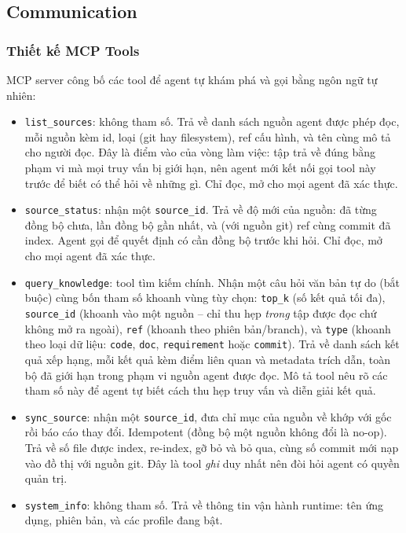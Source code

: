 \subsection{Communication}


\subsubsection{Thiết kế MCP Tools}

MCP server công bố các tool để agent tự khám phá và gọi bằng ngôn ngữ tự nhiên:

\begin{itemize}
  \item \texttt{list\_sources}: không tham số. Trả về danh sách nguồn agent được phép đọc, mỗi nguồn kèm id, loại (git hay filesystem), ref cấu hình, và tên cùng mô tả cho người đọc. Đây là điểm vào của vòng làm việc: tập trả về đúng bằng phạm vi mà mọi truy vấn bị giới hạn, nên agent mới kết nối gọi tool này trước để biết có thể hỏi về những gì. Chỉ đọc, mở cho mọi agent đã xác thực.
  \item \texttt{source\_status}: nhận một \texttt{source\_id}. Trả về độ mới của nguồn: đã từng đồng bộ chưa, lần đồng bộ gần nhất, và (với nguồn git) ref cùng commit đã index. Agent gọi để quyết định có cần đồng bộ trước khi hỏi. Chỉ đọc, mở cho mọi agent đã xác thực.
  \item \texttt{query\_knowledge}: tool tìm kiếm chính. Nhận một câu hỏi văn bản tự do (bắt buộc) cùng bốn tham số khoanh vùng tùy chọn: \texttt{top\_k} (số kết quả tối đa), \texttt{source\_id} (khoanh vào một nguồn -- chỉ thu hẹp \textit{trong} tập được đọc chứ không mở ra ngoài), \texttt{ref} (khoanh theo phiên bản/branch), và \texttt{type} (khoanh theo loại dữ liệu: \texttt{code}, \texttt{doc}, \texttt{requirement} hoặc \texttt{commit}). Trả về danh sách kết quả xếp hạng, mỗi kết quả kèm điểm liên quan và metadata trích dẫn, toàn bộ đã giới hạn trong phạm vi nguồn agent được đọc. Mô tả tool nêu rõ các tham số này để agent tự biết cách thu hẹp truy vấn và diễn giải kết quả.
  \item \texttt{sync\_source}: nhận một \texttt{source\_id}, đưa chỉ mục của nguồn về khớp với gốc rồi báo cáo thay đổi. Idempotent (đồng bộ một nguồn không đổi là no-op). Trả về số file được index, re-index, gỡ bỏ và bỏ qua, cùng số commit mới nạp vào đồ thị với nguồn git. Đây là tool \textit{ghi} duy nhất nên đòi hỏi agent có quyền quản trị.
  \item \texttt{system\_info}: không tham số. Trả về thông tin vận hành runtime: tên ứng dụng, phiên bản, và các profile đang bật.
\end{itemize}

